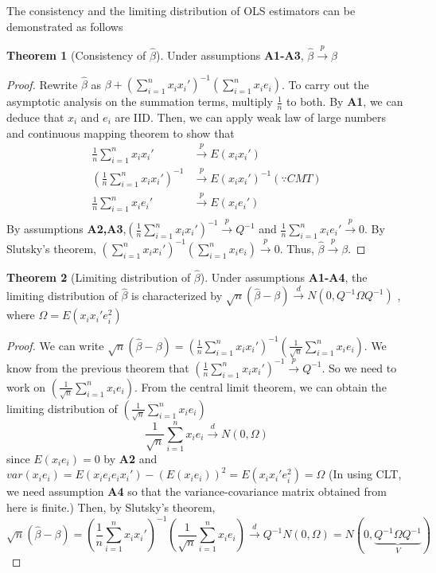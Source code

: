 \documentclass[12pt]{article}
\theoremstyle{definition}
\theoremstyle{property}
\theoremstyle{assumption}
\theoremstyle{example}
\theoremstyle{comment}
\newtheorem{theorem}{Theorem}[section]
\begin{document}
The consistency and the limiting distribution of OLS estimators can be demonstrated as follows
\begin{mdframed}[backgroundcolor=green!5] 
\begin{theorem}[Consistency of $\hat{\beta}$]
Under assumptions \textbf{A1-A3}, $\hat{\beta}\xrightarrow{p}\beta$
\begin{proof}
Rewrite $\hat{\beta}$ as $\beta+\left(\sum_{i=1}^nx_ix_i'\right)^{-1}\left(\sum_{i=1}^nx_ie_i\right)$. To carry out the asymptotic analysis on the summation terms, multiply $\frac{1}{n}$ to both. By \textbf{A1}, we can deduce that $x_i$ and $e_i$ are IID. Then, we can apply weak law of large numbers and continuous mapping theorem to show that
\[
\begin{aligned}
\frac{1}{n}\sum_{i=1}^nx_ix_i'&\xrightarrow{p}E\left(x_ix_i'\right) \\
\left(\frac{1}{n}\sum_{i=1}^nx_ix_i'\right)^{-1}&\xrightarrow{p}E\left(x_ix_i'\right)^{-1} (\because CMT)\\
\frac{1}{n}\sum_{i=1}^nx_ie_i'&\xrightarrow{p}E\left(x_ie_i'\right) \\
\end{aligned}
\]
By assumptions \textbf{A2,A3},$\left(\frac{1}{n}\sum_{i=1}^nx_ix_i'\right)^{-1}\xrightarrow{p}Q^{-1}$ and $\frac{1}{n}\sum_{i=1}^nx_ie_i'\xrightarrow{p}0$. By Slutsky's theorem, $\left(\sum_{i=1}^nx_ix_i'\right)^{-1}\left(\sum_{i=1}^nx_ie_i\right)\xrightarrow{p}0$. Thus, $\hat{\beta}\xrightarrow{p}\beta$.
\end{proof}
\end{theorem}
\begin{theorem}[Limiting distribution of $\hat{\beta}$]
Under assumptions \textbf{A1-A4}, the limiting distribution of $\hat{\beta}$ is characterized by $\sqrt{n}(\hat{\beta}-\beta)\xrightarrow{d}N(0,Q^{-1}\Omega Q^{-1})$ , where $\Omega = E(x_ix_i'e_i^2)$
\begin{proof}
We can write $\sqrt{n}(\hat{\beta}-\beta)=\left(\frac{1}{n}\sum_{i=1}^nx_ix_i'\right)^{-1}\left(\frac{1}{\sqrt{n}}\sum_{i=1}^nx_ie_i\right)$. We know from the previous theorem that $\left(\frac{1}{n}\sum_{i=1}^nx_ix_i'\right)^{-1}\xrightarrow{p}Q^{-1}$. So we need to work on $\left(\frac{1}{\sqrt{n}}\sum_{i=1}^nx_ie_i\right)$. From the central limit theorem, we can obtain the limiting distribution of  $\left(\frac{1}{\sqrt{n}}\sum_{i=1}^nx_ie_i\right)$ 
\[
\frac{1}{\sqrt{n}}\sum_{i=1}^nx_ie_i\xrightarrow{d} N(0,\Omega)
\]
since $E(x_ie_i)=0$ by \textbf{A2} and $var(x_ie_i)= E(x_ie_ie_ix_i')-(E(x_ie_i))^2 = E(x_ix_i'e_i^2)=\Omega$ (In using CLT, we need assumption \textbf{A4} so that the variance-covariance matrix obtained from here is finite.) Then, by Slutsky's theorem, 
\[
\sqrt{n}(\hat{\beta}-\beta)=\left(\frac{1}{n}\sum_{i=1}^nx_ix_i'\right)^{-1}\left(\frac{1}{\sqrt{n}}\sum_{i=1}^nx_ie_i\right)\xrightarrow{d}Q^{-1}N(0,\Omega)=N(0,\underbrace{Q^{-1}\Omega Q^{-1}}_{V})
\]
\end{proof}
\end{theorem}
\end{mdframed} \par
\end{document}
